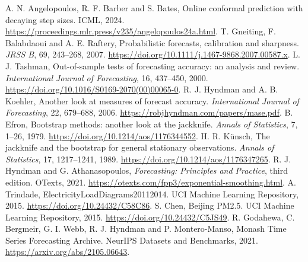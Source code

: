  A. N. Angelopoulos, R. F. Barber and S. Bates, Online conformal prediction with decaying step sizes. ICML, 2024. \url{https://proceedings.mlr.press/v235/angelopoulos24a.html}.
 T. Gneiting, F. Balabdaoui and A. E. Raftery, Probabilistic forecasts, calibration and sharpness. \emph{JRSS B}, 69, 243--268, 2007. \url{https://doi.org/10.1111/j.1467-9868.2007.00587.x}.
 L. J. Tashman, Out-of-sample tests of forecasting accuracy: an analysis and review. \emph{International Journal of Forecasting}, 16, 437--450, 2000. \url{https://doi.org/10.1016/S0169-2070(00)00065-0}.
 R. J. Hyndman and A. B. Koehler, Another look at measures of forecast accuracy. \emph{International Journal of Forecasting}, 22, 679--688, 2006. \url{https://robjhyndman.com/papers/mase.pdf}.
 B. Efron, Bootstrap methods: another look at the jackknife. \emph{Annals of Statistics}, 7, 1--26, 1979. \url{https://doi.org/10.1214/aos/1176344552}.
 H. R. K\"unsch, The jackknife and the bootstrap for general stationary observations. \emph{Annals of Statistics}, 17, 1217--1241, 1989. \url{https://doi.org/10.1214/aos/1176347265}.
 R. J. Hyndman and G. Athanasopoulos, \emph{Forecasting: Principles and Practice}, third edition. OTexts, 2021. \url{https://otexts.com/fpp3/exponential-smoothing.html}.
 A. Trindade, ElectricityLoadDiagrams20112014. UCI Machine Learning Repository, 2015. \url{https://doi.org/10.24432/C58C86}.
 S. Chen, Beijing PM2.5. UCI Machine Learning Repository, 2015. \url{https://doi.org/10.24432/C5JS49}.
 R. Godahewa, C. Bergmeir, G. I. Webb, R. J. Hyndman and P. Montero-Manso, Monash Time Series Forecasting Archive. NeurIPS Datasets and Benchmarks, 2021. \url{https://arxiv.org/abs/2105.06643}.
